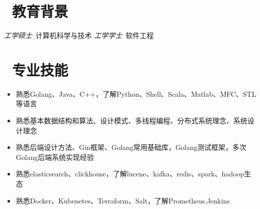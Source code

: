 \documentclass{resume}
\begin{document}


 
\section{\faGraduationCap\  教育背景}
\textit{工学硕士}\ 计算机科学与技术
\textit{工学学士}\ 软件工程

\section{\faCogs\ 专业技能}
\begin{itemize}[parsep=0.5ex]
  \item 熟悉Golang、Java、C++，了解Python、Shell、Scala、Matlab、MFC、STL等语言
  \item 熟悉基本数据结构和算法、设计模式、多线程编程、分布式系统理念、系统设计理念
  \item 熟悉后端设计方法、Gin框架、Golang常用基础库，Golang测试框架，多次Golang后端系统实现经验
  \item 熟悉elasticsearch、clickhouse，了解lucene、kafka、redis、spark、hadoop生态
  \item 熟悉Docker、Kubenetes、Terraform、Salt，了解Prometheus,Jenkins
\end{itemize}
\end{document}

